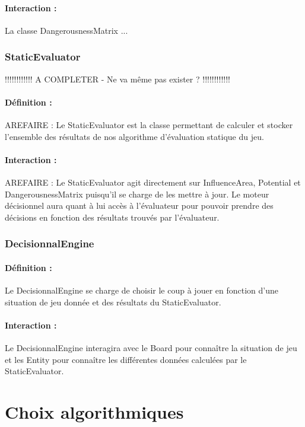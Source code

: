 \documentclass[12pt]{article}
\begin{document}
				\paragraph{Interaction :}
				La classe DangerousnessMatrix ...

			\subsubsection{StaticEvaluator}

				!!!!!!!!!!!! A COMPLETER - Ne va même pas exister ? !!!!!!!!!!!!
				\paragraph{Définition :}
				AREFAIRE : Le StaticEvaluator est la classe permettant de calculer et stocker l'ensemble des résultats de nos algorithme 
				d'évaluation statique du jeu.
				\paragraph{Interaction :}
				AREFAIRE : Le StaticEvaluator agit directement sur InfluenceArea, Potential et DangerousnessMatrix puisqu'il se charge 
				de les mettre à jour. Le moteur décisionnel aura quant à lui accès à l'évaluateur pour pouvoir prendre des décisions en fonction 
				des résultats trouvés par l'évaluateur.

			\subsubsection{DecisionnalEngine}

				\paragraph{Définition :}
				Le DecisionnalEngine se charge de choisir le coup à jouer en fonction d'une situation de jeu donnée et des résultats 
				du StaticEvaluator.
				\paragraph{Interaction :}
				Le DecisionnalEngine interagira avec le Board pour connaître la situation de jeu et les Entity pour connaître les 
				différentes données calculées par le StaticEvaluator.

		\clearpage
		
	\section{Choix algorithmiques}    
\end{document}
